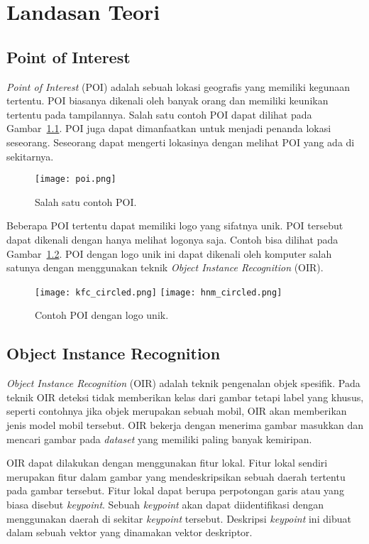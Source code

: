 \chapter{Landasan Teori}
\label{chap:landasan_teori}

\section{Point of Interest}
\label{sec:poi}

\textit{Point of Interest} (POI) adalah sebuah lokasi geografis yang memiliki kegunaan tertentu. POI biasanya dikenali oleh banyak orang dan memiliki keunikan tertentu pada tampilannya. Salah satu contoh POI dapat dilihat pada Gambar~\ref{fig:poi}. POI juga dapat dimanfaatkan untuk menjadi penanda lokasi seseorang. Seseorang dapat mengerti lokasinya dengan melihat POI yang ada di sekitarnya.
\begin{figure}[H]
	\centering
	\texttt{[image: poi.png]}
	\caption{Salah satu contoh POI.}
	\label{fig:poi}
\end{figure}

Beberapa POI tertentu dapat memiliki logo yang sifatnya unik. POI tersebut dapat dikenali dengan hanya melihat logonya saja. Contoh bisa dilihat pada Gambar~\ref{fig:poi_logo}. POI dengan logo unik ini dapat dikenali oleh komputer salah satunya dengan menggunakan teknik \textit{Object Instance Recognition} (OIR). 
\begin{figure}[H]
	\centering
	\texttt{[image: kfc\_circled.png]}
	\texttt{[image: hnm\_circled.png]}
	\caption{Contoh POI dengan logo unik.}
	\label{fig:poi_logo}
\end{figure}

\section{Object Instance Recognition}
\label{sec:oir}

\textit{Object Instance Recognition} (OIR) adalah teknik pengenalan objek spesifik. Pada teknik OIR deteksi tidak memberikan kelas dari gambar tetapi label yang khusus, seperti contohnya jika objek merupakan sebuah mobil, OIR akan memberikan jenis model mobil tersebut. OIR bekerja dengan menerima gambar masukkan dan mencari gambar pada \textit{dataset} yang memiliki paling banyak kemiripan.

OIR dapat dilakukan dengan menggunakan fitur lokal. Fitur lokal sendiri merupakan fitur dalam gambar yang mendeskripsikan sebuah daerah tertentu pada gambar tersebut. Fitur lokal dapat berupa perpotongan garis atau yang biasa disebut \textit{keypoint}. Sebuah \textit{keypoint} akan dapat diidentifikasi dengan menggunakan daerah di sekitar \textit{keypoint} tersebut. Deskripsi \textit{keypoint} ini dibuat dalam sebuah vektor yang dinamakan vektor deskriptor.

